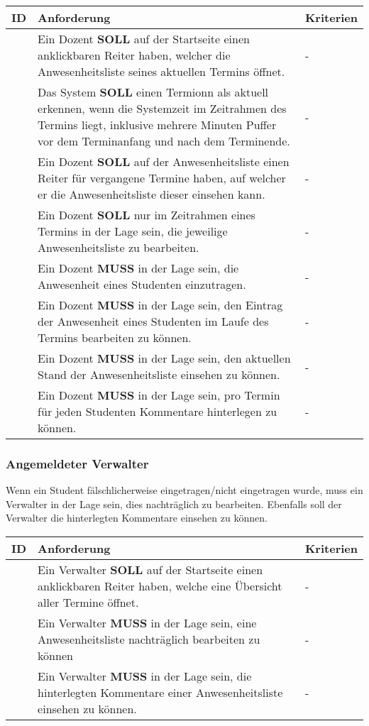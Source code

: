 \begin{tabular} {|p{}|p{}|p{}|}
	\hline
	ID & Anforderung & Kriterien \\
	\hline
	\printfreqnr
	& Ein Dozent \textbf{SOLL} auf der Startseite einen anklickbaren Reiter haben, welcher die Anwesenheitsliste seines aktuellen Termins öffnet.
	& - \\
	\hline
	\printfreqnr
	& Das System \textbf{SOLL} einen Termionn als aktuell erkennen, wenn die Systemzeit im Zeitrahmen des Termins liegt, inklusive mehrere Minuten Puffer vor dem Terminanfang und nach dem Terminende.
	& - \\
	\hline
	\printfreqnr
	& Ein Dozent \textbf{SOLL} auf der Anwesenheitsliste einen Reiter für vergangene Termine haben, auf welcher er die Anwesenheitsliste dieser einsehen kann.
	& - \\
	\hline
	\printfreqnr
	& Ein Dozent \textbf{SOLL} nur im Zeitrahmen eines Termins in der Lage sein, die jeweilige Anwesenheitsliste zu bearbeiten.
	& - \\
	\hline
	\printfreqnr
	& Ein Dozent \textbf{MUSS} in der Lage sein, die Anwesenheit eines Studenten einzutragen.
	& - \\
	\hline
	\printfreqnr
	& Ein Dozent \textbf{MUSS} in der Lage sein, den Eintrag der Anwesenheit eines Studenten im Laufe des Termins bearbeiten zu können. 
	& - \\
	\hline
	\printfreqnr
	& Ein Dozent \textbf{MUSS} in der Lage sein, den aktuellen Stand der Anwesenheitsliste einsehen zu können.
	& - \\
	\hline
	\printfreqnr
	& Ein Dozent \textbf{MUSS} in der Lage sein, pro Termin für jeden Studenten Kommentare hinterlegen zu können.
	& - \\
	\hline
\end{tabular}

\newpage

\subsubsection{Angemeldeter Verwalter}
Wenn ein Student fälschlicherweise eingetragen/nicht eingetragen wurde, muss ein Verwalter in der Lage sein, dies nachträglich zu bearbeiten. Ebenfalls soll der Verwalter die hinterlegten Kommentare einsehen zu können.
\vspace{12pt}

\begin{tabular} {|p{}|p{}|p{}|}
	\hline
	ID & Anforderung & Kriterien \\
	\hline
	\printfreqnr
	& Ein Verwalter \textbf{SOLL} auf der Startseite einen anklickbaren Reiter haben, welche eine Übersicht aller Termine öffnet.
	& - \\
	\hline
	\printfreqnr
	& Ein Verwalter \textbf{MUSS} in der Lage sein, eine Anwesenheitsliste nachträglich bearbeiten zu können
	& - \\
	\hline
	\printfreqnr
	& Ein Verwalter \textbf{MUSS} in der Lage sein, die hinterlegten Kommentare einer Anwesenheitsliste einsehen zu können.
	& - \\
	\hline
\end{tabular}

